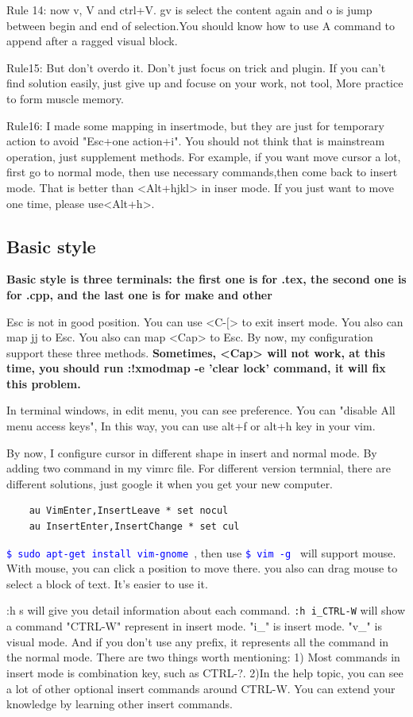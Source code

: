 \documentclass[paper=8.5in:11in, twoside, 12pt, pagesize=pdftex]{book}
\newcommand{\linuxcommand}[1]{\texttt{\textcolor{blue}{\$ #1 \Pisymbol{psy}{191}}}}
\begin{document}
Rule 14: now v, V and ctrl+V. gv is select the content again and o is jump between begin and end of selection.You should know how to use A command to append after a ragged visual block.


Rule15: But don't overdo it. Don't just focus on trick and plugin. If you can't find solution easily, just give up and focuse on your work, not tool, More practice to form muscle memory.

Rule16: I made some mapping in insertmode, but they are just for temporary action to avoid "Esc+one action+i". You should not think that is mainstream operation, just supplement methods. For example, if you want move cursor a lot, first go to normal mode, then use necessary commands,then come back to insert mode. That is better than <Alt+hjkl> in inser mode. If you just want to move one time, please use<Alt+h>.


\subsection{Basic style}

\textbf{Basic style is three terminals: the first one is for .tex, the second one is for .cpp, and the last one is for make and other}

Esc is not in good position. You can use <C-$[$> to exit insert mode. You also can map jj to Esc. You also can map <Cap> to Esc. By now, my configuration support these three methods. \textbf{Sometimes, <Cap> will not work, at this time, you should run :!xmodmap -e 'clear lock' command, it will fix this problem.}

In terminal windows, in edit menu, you can see preference. You can "disable All menu access keys", In this way, you can use alt+f or alt+h key in your vim. 

By now, I configure cursor in different shape in insert and normal mode. By adding two command in my vimrc file. For different version termnial, there are different solutions, just google it when you get your new computer.
\begin{verbatim}
	au VimEnter,InsertLeave * set nocul
	au InsertEnter,InsertChange * set cul
\end{verbatim} 		

\linuxcommand{sudo apt-get install vim-gnome}, then use \linuxcommand{vim -g} will support mouse.  With mouse, you can click a position to move there. you also can drag mouse to select a block of text. It's easier to use it.  

:h s will give you detail information about each command. \verb=:h i_CTRL-W= will show a command "CTRL-W" represent in insert mode. "i\_" is insert mode. "v\_" is visual mode. And if you don't use any prefix, it represents all the command in the normal mode. There are two things worth mentioning: 1) Most commands in insert mode is combination key, such as CTRL-?. 2)In the help topic, you can see a lot of other optional insert commands around CTRL-W. You can extend your knowledge by learning other insert commands.
\end{document}

